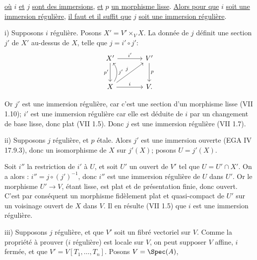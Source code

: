 
\uline{où} $i$ \uline{et} $j$
\uline{sont des immersions}, \uline{et} $p$ \uline{un morphisme lisse}. \uline{Alors pour que} $i$ \uline{soit une immersion régulière}, \uline{il faut et il suffit que} $j$ \uline{soit une immersion régulière}.

i) Supposons $i$ régulière. Posons $X'=V'\times_V X$. La donnée de $j$ définit une section $j'$ de $X'$ au-dessus de $X$, telle que $j=i'\circ j'$:
\[
\begin{tikzcd}[column sep=large,row sep=large]
X' \arrow[r,"i'"] \arrow[d,"p'"'] & V' \arrow[d,"p"]\\
X \arrow[r,"i"] \arrow[ur,"j"] \arrow[u,bend right=35,"j'"'] & V .
\end{tikzcd}
\]

Or $j'$ est une immersion régulière, car c'est une section d'un morphisme lisse (VII 1.10); $i'$ est une immersion régulière car elle est déduite de $i$ par un changement de base lisse, donc plat (VII 1.5). Donc $j$ est une immersion régulière (VII 1.7).

ii) Supposons $j$ régulière, et $p$ étale. Alors $j'$ est une immersion ouverte (EGA IV 17.9.3), donc un isomorphisme de $X$ sur $j'(X)$; posons $U=j'(X)$.

Soit $i''$ la restriction de $i'$ à $U$, et soit $U'$ un ouvert de $V'$ tel que $U=U'\cap X'$. On a alors : $i''=j\circ(j')^{-1}$, donc $i''$ est une immersion régulière de $U$ dans $U'$. Or le morphisme $U'\to V$, étant lisse, est plat et de présentation finie, donc ouvert. C'est par conséquent un morphisme fidèlement plat et quasi-compact de $U'$ sur un voisinage ouvert de $X$ dans $V$. Il en résulte (VII 1.5) que $i$ est une immersion régulière.

iii) Supposons $j$ régulière, et que $V'$ soit un fibré vectoriel sur $V$. Comme la propriété à prouver ($i$ régulière) est locale sur $V$, on peut supposer $V$ affine, $i$ fermée, et que $V'=V[T_1,\ldots,T_n]$. Posons $V=\Spec(A)$,
